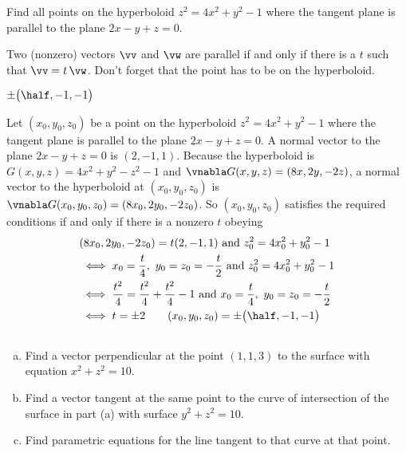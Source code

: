 \begin{question}[M226 2009D] %
Find all points on the hyperboloid $z^2=4x^2+y^2-1$
where the tangent plane is parallel to the plane $2x-y+z=0$.
\end{question}

\begin{hint}
Two (nonzero) vectors $\vv$ and $\vw$ are parallel if and only if there  
is a $t$ such that $\vv=t\,\vw$.
Don't forget that the point has to be on the hyperboloid.
\end{hint}

\begin{answer}
$\pm \big(\half,-1,-1\big)$
\end{answer}

\begin{solution} 
Let $(x_0,y_0,z_0)$  be a point on the hyperboloid $z^2=4x^2+y^2-1$
where the tangent plane is parallel to the plane $2x-y+z=0$. A normal vector
to the plane $2x-y+z=0$ is $( 2,-1,1)$. Because the hyperboloid is
$G(x,y,z)=4x^2+y^2-z^2-1$ and $\vnabla G(x,y,z) = ( 8x,2y,-2z)$,
 a normal vector to the hyperboloid at $(x_0,y_0,z_0)$ is 
$\vnabla G(x_0,y_0,z_0)=( 8x_0,2y_0,-2z_0)$. 
So $(x_0,y_0,z_0)$ satisfies the required conditions if and only if there is a nonzero $t$ obeying
\begin{align*}
&( 8x_0,2y_0,-2z_0) =t( 2,-1,1) \text{ and }
 z_0^2=4x_0^2+y_0^2-1\\
&\iff x_0=\frac{t}{4},\ y_0=z_0=-\frac{t}{2}\text{ and }
 z_0^2=4x_0^2+y_0^2-1\\
&\iff \frac{t^2}{4}= \frac{t^2}{4}+ \frac{t^2}{4}-1\text{ and }
     x_0=\frac{t}{4},\ y_0=z_0=-\frac{t}{2}\\
& \iff t=\pm 2\qquad
(x_0,y_0,z_0)=\pm \big(\half,-1,-1\big)
\end{align*}

\end{solution}

\subsection*{\Application}

\begin{question}[M200 2000D] %
\begin{enumerate}[(a)]
\item
Find a vector perpendicular at the point
$(1,1,3)$ to the surface with equation $x^2+z^2=10$.

\item 
Find a vector tangent at the same point to the curve of 
intersection of the surface in part (a) with surface $y^2+z^2=10$.

\item 
Find parametric equations for the line tangent to that curve
at that point.
\end{enumerate}
\end{question}


